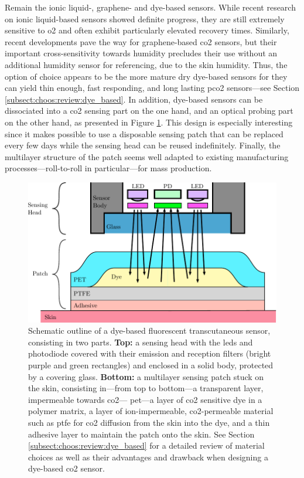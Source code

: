 Remain the ionic liquid-, graphene- and dye-based sensors. While recent research on ionic liquid-based sensors showed definite progress, they are still extremely sensitive to \gls{o2} and often exhibit particularly elevated recovery times\cite{willa2017, fapyane2020}. Similarly, recent developments pave the way for graphene-based \gls{co2} sensors\cite{akhter2021}, but their important cross-sensitivity towards humidity precludes their use without an additional humidity sensor for referencing, due to the skin humidity. Thus, the option of choice appears to be the more mature dry dye-based sensors for they can yield thin enough, fast responding, and long lasting \gls{pco2} sensors---see Section \ref{subsect:choos:review:dye_based}. In addition, dye-based sensors can be dissociated into a \gls{co2} sensing part on the one hand, and an optical probing part on the other hand, as presented in Figure \ref{fig:choos:pot:fluo_patch}. This design is especially interesting since it makes possible to use a disposable sensing patch that can be replaced every few days while the sensing head can be reused indefinitely. Finally, the multilayer structure of the patch seems well adapted to existing manufacturing processes---roll-to-roll in particular---for mass production\cite{briand2011, kostler2011}.

\begin{figure}
	\centering
	\includegraphics{1_main_matter/choos_figures/review/fluo_patch}
	\caption[Schematic outline of a dye-based fluorescent transcutaneous sensor, consisting in two parts.]{Schematic outline of a dye-based fluorescent transcutaneous sensor, consisting in two parts. \textbf{Top:} a sensing head with the \glspl{led} and photodiode covered with their emission and reception filters (bright purple and green rectangles) and enclosed in a solid body, protected by a covering glass. \textbf{Bottom:} a multilayer sensing patch stuck on the skin, consisting in---from top to bottom---a transparent layer, impermeable towards \gls{co2}---\eg{} \gls{pet}---a layer of \gls{co2} sensitive dye in a polymer matrix, a layer of ion-impermeable, \gls{co2}-permeable material such as \gls{ptfe} for \gls{co2} diffusion from the skin into the dye, and a thin adhesive layer to maintain the patch onto the skin. See Section \ref{subsect:choos:review:dye_based} for a detailed review of material choices as well as their advantages and drawback when designing a dye-based \gls{co2} sensor.}
	\label{fig:choos:pot:fluo_patch}
\end{figure}

